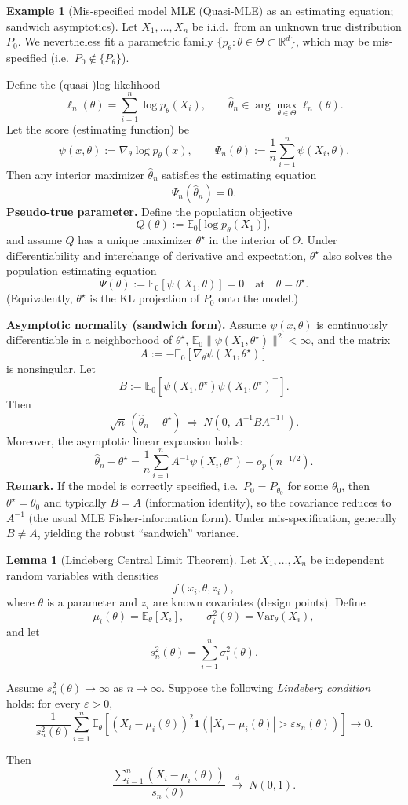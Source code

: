 \documentclass[11pt]{article}
\theoremstyle{definition}
\newtheorem{exmp}{Example}[section]
\newtheorem{lemma}{Lemma}[section]
\begin{document}
\begin{exmp}[Mis-specified model MLE (Quasi-MLE) as an estimating equation; sandwich asymptotics]
Let $X_1,\dots,X_n$ be i.i.d.\ from an unknown true distribution $P_0$.
We nevertheless fit a parametric family $\{p_\theta:\theta\in\Theta\subset\mathbb R^d\}$,
which may be mis-specified (i.e.\ $P_0\notin\{P_\theta\}$).

Define the (quasi-)log-likelihood
\[
\ell_n(\theta)=\sum_{i=1}^n \log p_\theta(X_i),
\qquad
\hat\theta_n \in \arg\max_{\theta\in\Theta}\ell_n(\theta).
\]
Let the score (estimating function) be
\[
\psi(x,\theta):=\nabla_\theta \log p_\theta(x),
\qquad
\Psi_n(\theta):=\frac1n\sum_{i=1}^n \psi(X_i,\theta).
\]
Then any interior maximizer $\hat\theta_n$ satisfies the estimating equation
\[
\Psi_n(\hat\theta_n)=0.
\]
\noindent\textbf{Pseudo-true parameter.}
Define the population objective
\[
Q(\theta):=\mathbb E_0\big[\log p_\theta(X_1)\big],
\]
and assume $Q$ has a unique maximizer $\theta^\star$ in the interior of $\Theta$.
Under differentiability and interchange of derivative and expectation,
$\theta^\star$ also solves the population estimating equation
\[
\Psi(\theta):=\mathbb E_0[\psi(X_1,\theta)]=0
\quad\text{at}\quad \theta=\theta^\star.
\]
(Equivalently, $\theta^\star$ is the KL projection of $P_0$ onto the model.)

\noindent\textbf{Asymptotic normality (sandwich form).}
Assume $\psi(x,\theta)$ is continuously differentiable in a neighborhood of $\theta^\star$,
$\mathbb E_0\|\psi(X_1,\theta^\star)\|^2<\infty$, and the matrix
\[
A:=-\mathbb E_0\!\left[\nabla_\theta \psi(X_1,\theta^\star)\right]
\]
is nonsingular. Let
\[
B:=\mathbb E_0\!\left[\psi(X_1,\theta^\star)\psi(X_1,\theta^\star)^\top\right].
\]
Then
\[
\sqrt{n}\,(\hat\theta_n-\theta^\star)
\ \Rightarrow\
N\!\left(0,\ A^{-1}BA^{-1\top}\right).
\]
Moreover, the asymptotic linear expansion holds:
\[
\hat\theta_n-\theta^\star
=
\frac1n\sum_{i=1}^n A^{-1}\psi(X_i,\theta^\star)
+o_p(n^{-1/2}).
\]
\noindent\textbf{Remark.}
If the model is correctly specified, i.e.\ $P_0=P_{\theta_0}$ for some $\theta_0$,
then $\theta^\star=\theta_0$ and typically $B=A$ (information identity),
so the covariance reduces to $A^{-1}$ (the usual MLE Fisher-information form).
Under mis-specification, generally $B\neq A$, yielding the robust ``sandwich'' variance.
\end{exmp}
\begin{lemma}[Lindeberg Central Limit Theorem]
Let $X_1,\dots,X_n$ be independent random variables with densities
\[
f(x_i,\theta,z_i),
\]
where $\theta$ is a parameter and $z_i$ are known covariates (design points).  
Define
\[
\mu_i(\theta)=\mathbb{E}_\theta[X_i], \qquad 
\sigma_i^2(\theta)=\mathrm{Var}_\theta(X_i),
\]
and let
\[
s_n^2(\theta)=\sum_{i=1}^n \sigma_i^2(\theta).
\]

Assume $s_n^2(\theta)\to\infty$ as $n\to\infty$. Suppose the following
\emph{Lindeberg condition} holds: for every $\varepsilon>0$,
\[
\frac{1}{s_n^2(\theta)}
\sum_{i=1}^n
\mathbb{E}_\theta\!\left[
(X_i-\mu_i(\theta))^2
\mathbf{1}\!\left(
|X_i-\mu_i(\theta)|>\varepsilon s_n(\theta)
\right)
\right]
\longrightarrow 0.
\]

Then
\[
\frac{\sum_{i=1}^n (X_i-\mu_i(\theta))}{s_n(\theta)}
\;\xrightarrow{d}\;
N(0,1).
\]
\end{lemma}
\end{document}
